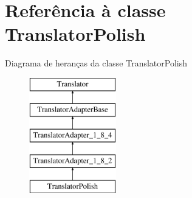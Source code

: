 \hypertarget{class_translator_polish}{\section{Referência à classe Translator\-Polish}
\label{class_translator_polish}
}
Diagrama de heranças da classe Translator\-Polish\begin{figure}[H]
\begin{center}
\leavevmode
\includegraphics[height=5.000000cm]{class_translator_polish}
\end{center}
\end{figure}
